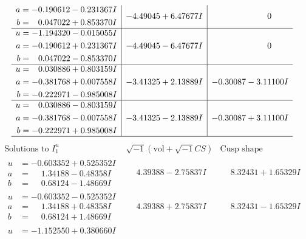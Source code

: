 \documentclass[1p]{elsarticle_modified}
\theoremstyle{definition}
\newcommand{\I}{\sqrt{-1}}
\begin{document}
$$\begin{array}{c|c|c}
\begin{aligned}
a &= -0.190612 - 0.231367 I \\
b &= \phantom{-}0.047022 + 0.853370 I\end{aligned}
 & -4.49045 + 6.47677 I & \phantom{-0.000000 } 0 \\ \hline\begin{aligned}
u &= -1.194320 - 0.015055 I \\
a &= -0.190612 + 0.231367 I \\
b &= \phantom{-}0.047022 - 0.853370 I\end{aligned}
 & -4.49045 - 6.47677 I & \phantom{-0.000000 } 0 \\ \hline\begin{aligned}
u &= \phantom{-}0.030886 + 0.803159 I \\
a &= -0.381768 + 0.007558 I \\
b &= -0.222971 - 0.985008 I\end{aligned}
 & -3.41325 + 2.13889 I & -0.30087 - 3.11100 I \\ \hline\begin{aligned}
u &= \phantom{-}0.030886 - 0.803159 I \\
a &= -0.381768 - 0.007558 I \\
b &= -0.222971 + 0.985008 I\end{aligned}
 & -3.41325 - 2.13889 I & -0.30087 + 3.11100 I\\
 \hline 
 \end{array}$$\newpage$$\begin{array}{c|c|c}  
\text{Solutions to }I^u_{1}& \I (\text{vol} + \sqrt{-1}CS) & \text{Cusp shape}\\
 \hline 
\begin{aligned}
u &= -0.603352 + 0.525352 I \\
a &= \phantom{-}1.34188 - 0.48358 I \\
b &= \phantom{-}0.68124 - 1.48669 I\end{aligned}
 & \phantom{-}4.39388 - 2.75837 I & \phantom{-}8.32431 + 1.65329 I \\ \hline\begin{aligned}
u &= -0.603352 - 0.525352 I \\
a &= \phantom{-}1.34188 + 0.48358 I \\
b &= \phantom{-}0.68124 + 1.48669 I\end{aligned}
 & \phantom{-}4.39388 + 2.75837 I & \phantom{-}8.32431 - 1.65329 I \\ \hline\begin{aligned}
u &= -1.152550 + 0.380660 I \\

\end{aligned}
\end{array}$$
\end{document}
